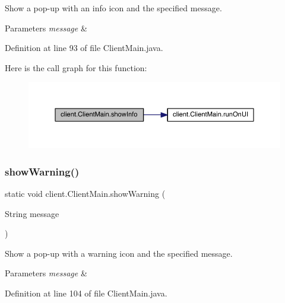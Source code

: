 Show a pop-\/up with an info icon and the specified message.


\begin{DoxyParams}{Parameters}
{\em message} & \\
\hline
\end{DoxyParams}


Definition at line 93 of file Client\+Main.\+java.

Here is the call graph for this function\+:
\nopagebreak
\begin{figure}[H]
\begin{center}
\leavevmode
\includegraphics[width=350pt]{classclient_1_1_client_main_af975fd50f5fb1cc3ec29b65854b2a412_cgraph}
\end{center}
\end{figure}
\hypertarget{classclient_1_1_client_main_a0964644423f3d533ca394456ee6f6c95}{}\label{classclient_1_1_client_main_a0964644423f3d533ca394456ee6f6c95} 
\subsubsection{\texorpdfstring{show\+Warning()}{showWarning()}}
{\footnotesize\ttfamily static void client.\+Client\+Main.\+show\+Warning (\begin{DoxyParamCaption}\item[{String}]{message }\end{DoxyParamCaption})\hspace{0.3cm}{\ttfamily [static]}}

Show a pop-\/up with a warning icon and the specified message.


\begin{DoxyParams}{Parameters}
{\em message} & \\
\hline
\end{DoxyParams}


Definition at line 104 of file Client\+Main.\+java.

